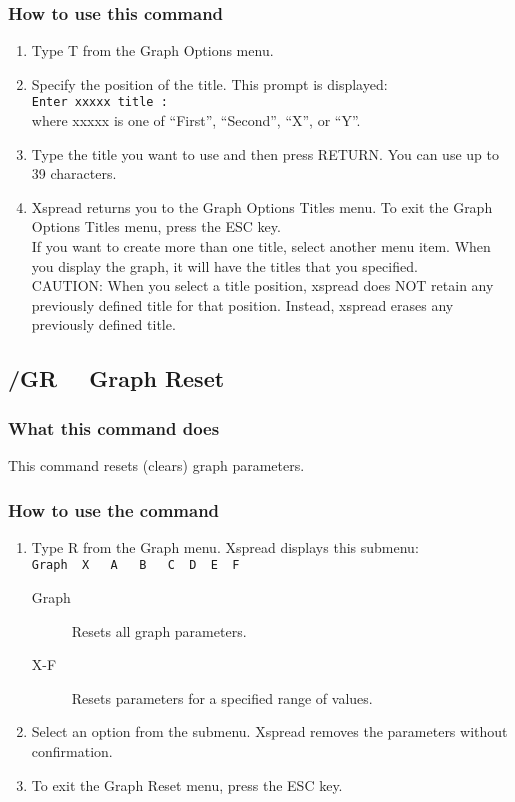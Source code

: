 \subsubsection*{How to use this command}
\begin{enumerate}
\item{Type T from the Graph Options menu.}
\item{Specify the position of the title.  This prompt is displayed:\\
        {\tt Enter xxxxx title :}\\
        where xxxxx is one of ``First'', ``Second'', ``X'', or ``Y''.}
\item{Type the title you want to use and then press RETURN.  You can use
        up to 39 characters.}
\item{Xspread returns you to the Graph Options Titles menu.  To exit the
        Graph Options Titles menu, press the ESC key.\\
        If you want to create more than one title, select another menu item.
        When you display the graph, it will have the titles that you
        specified.\\
        CAUTION:  When you select a title position, xspread does NOT retain
        any previously defined title for that position.  Instead, xspread
        erases any previously defined title.}
\end{enumerate}
            
\subsection*{/GR \ \     Graph Reset}

\subsubsection*{What this command does}
This command resets (clears) graph parameters.

\subsubsection*{How to use the command}
\begin{enumerate}
\item{Type R from the Graph menu.  Xspread displays this submenu: \\
  {\tt Graph\ \   X \ \  A \ \  B \ \  C\ \   D\ \   E\ \   F} \\
  \begin{description}
  \item[Graph]{Resets all graph parameters.}
  \item[X-F]{Resets parameters for a specified range of values.}
  \end{description} }
\item{Select an option from the submenu. Xspread removes the parameters
        without confirmation.}
\item{To exit the Graph Reset menu, press the ESC key.}
\end{enumerate}
        
